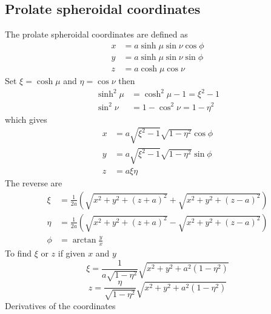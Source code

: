 \documentclass[a4paper,10pt]{article}
\begin{document}
\subsection{Prolate spheroidal coordinates}
  The prolate spheroidal coordinates are defined as
  \begin{equation}\begin{split}
    x &= a \sinh{\mu}\sin{\nu}\cos{\phi}\\
    y &= a \sinh{\mu}\sin{\nu}\sin{\phi}\\
    z &= a \cosh{\mu}\cos{\nu}
  \end{split}\end{equation}
  Set \(\xi = \cosh{\mu}\) and \(\eta = \cos{\nu}\) then
  \begin{equation}\begin{split}
    \sinh^2{\mu} &= \cosh^2{\mu} - 1 = \xi^2 - 1\\
    \sin^2{\nu}  &= 1 - \cos^2{\nu} = 1 - \eta^2
  \end{split}\end{equation}
  which gives
  \begin{equation}\begin{split}
    x &= a \sqrt{\xi^2-1}\sqrt{1-\eta^2} \cos{\phi}\\
    y &= a \sqrt{\xi^2-1}\sqrt{1-\eta^2} \sin{\phi}\\
    z &= a \xi \eta
  \end{split}\end{equation}
  The reverse are
  \begin{equation}\begin{split}
    \xi &= \frac{1}{2a} \left( \sqrt{x^2 + y^2 + (z+a)^2} + \sqrt{x^2 + y^2 + (z-a)^2} \right)\\
    \eta &= \frac{1}{2a} \left( \sqrt{x^2 + y^2 + (z+a)^2} - \sqrt{x^2 + y^2 + (z-a)^2} \right)\\
    \phi &= \arctan{\frac{y}{x}}
  \end{split}\end{equation}
  To find \(\xi\) or \(z\) if given \(x\) and \(y\)
  \begin{equation}
    \xi = \frac{1}{a\sqrt{1-\eta^2}}\sqrt{x^2 + y^2 + a^2(1-\eta^2)}
  \end{equation}
  \begin{equation}
    z = \frac{\eta}{\sqrt{1-\eta^2}}\sqrt{x^2 + y^2 + a^2(1-\eta^2)}
  \end{equation}
  Derivatives of the coordinates
\end{document}
